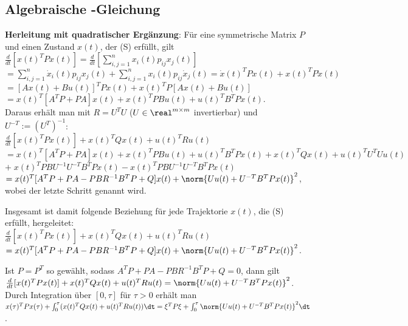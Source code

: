 \pagebreak

\subsection{%
    Algebraische -Gleichung%
}

\textbf{Herleitung mit quadratischer Ergänzung}:
Für eine symmetrische Matrix $P$ und einen Zustand $x(t)$, der (S) erfüllt, gilt
$\frac{d}{dt} [x(t)^T Px(t)]
= \frac{d}{dt} [\sum_{i,j=1}^n x_i(t) p_{ij} x_j(t)]$\\
$= \sum_{i,j=1}^n \dot{x}_i(t) p_{ij} x_j(t) + \sum_{i,j=1}^n x_i(t) p_{ij} \dot{x}_j(t)
= \dot{x}(t)^T Px(t) + x(t)^T P\dot{x}(t)$\\
$= [Ax(t) + Bu(t)]^T Px(t) + x(t)^T P [Ax(t) + Bu(t)]$\\
$= x(t)^T [A^T P + PA] x(t) + x(t)^T PB u(t) + u(t)^T B^T Px(t)$.\\
Daraus erhält man mit $R = U^T U$ ($U \in \real^{m \times m}$ invertierbar) und
$U^{-T} := (U^T)^{-1}$:\\
$\frac{d}{dt} [x(t)^T Px(t)] + x(t)^T Qx(t) + u(t)^T Ru(t)$\\
$= x(t)^T [A^T P + PA] x(t) + x(t)^T PB u(t) + u(t)^T B^T Px(t) + x(t)^T Qx(t) +
u(t)^T U^T Uu(t)$\\
$+\; x(t)^T PB U^{-1} U^{-T} B^T P x(t) - x(t)^T PB U^{-1} U^{-T} B^T P x(t)$\\
$= x(t)^T [A^T P + PA - PBR^{-1} B^T P + Q] x(t) + \norm{Uu(t) + U^{-T} B^T P x(t)}^2$,
wobei der letzte Schritt  genannt wird.

\linie

Insgesamt ist damit folgende Beziehung für jede Trajektorie $x(t)$, die (S) erfüllt, hergeleitet:\\
$\frac{d}{dt} [x(t)^T Px(t)] + x(t)^T Qx(t) + u(t)^T Ru(t)$\\
$= x(t)^T [A^T P + PA - PBR^{-1} B^T P + Q] x(t) + \norm{Uu(t) + U^{-T} B^T P x(t)}^2$.

Ist $P = P^T$ so gewählt, sodass $A^T P + PA - PBR^{-1} B^T P + Q = 0$, dann gilt\\
$\frac{d}{dt} [x(t)^T Px(t)] + x(t)^T Qx(t) + u(t)^T Ru(t) = \norm{Uu(t) + U^{-T} B^T P x(t)}^2$.\\
Durch Integration über $[0, \tau]$ für $\tau > 0$ erhält man\\
$x(\tau)^T Px(\tau) + \int_0^\tau (x(t)^T Qx(t) + u(t)^T Ru(t)) \dt
= \xi^T P \xi + \int_0^\tau \norm{Uu(t) + U^{-T} B^T P x(t)}^2 \dt$.

